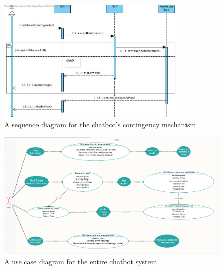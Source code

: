 \begin{figure}[!htbp]
    \centering
    \includegraphics[width= 0.8\textwidth]{Diagrams/ata_diags/Sequence Diagram for Part-3.jpg}
    \caption{A sequence diagram for the chatbot's contingency mechanism}
    \label{Fig: seq diag contingency}
\end{figure}

\begin{figure}[!htbp]
    \centering
    \includegraphics[width=\textwidth]{Diagrams/ata_diags/image.png}
    \caption{A use case diagram for the entire chatbot system}
    \label{Fig: use case whole system}
\end{figure}

